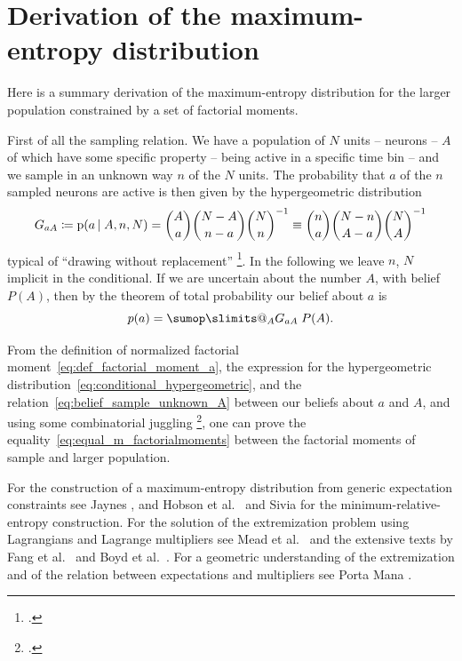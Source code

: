 \documentclass[\ifafour a4paper,12pt,\else a5paper,10pt,\fi%
onecolumn,oneside,article,%
british%
]{memoir}
\makeatletter
\theoremstyle{remark}
\theoremstyle{innote}
\def\sum{\DOTSI\sumop\slimits@}
\newcommand*{\citep}{\footcites}
\newcommand*{\citey}{\parencites*}
\newcommand*{\defd}{\coloneqq}
\newcommand*{\pf}{\mathrm{p}}%
\renewcommand*{\|}{\nonscript\,\vert\nonscript\;\mathopen{}}
\newcommand*{\sect}{\S}%
\newcommand*{\sects}{\S\S}%
\newcommand*{\chap}{ch.}%
\newcommand*{\chaps}{chs}%
\newcommand*{\eg}{{e.g.}}
\newcommand*{\etal}{{et al.}}
\newcommand*{\yG}{G}
\newcommand*{\yAv}{A}
\newcommand*{\yav}{a}
\newcommand*{\ya}{\yav}%
\newcommand*{\yA}{\yAv}%
\makeatother
\begin{document}
\section{Derivation of the maximum-entropy distribution}
\label{sec:derivation_maxent_fullnet}

Here is a summary derivation of the maximum-entropy distribution for the
larger population constrained by a set of factorial moments.%

\bigskip

First of all the sampling relation. We have a population of $N$ units --
neurons -- $\yA$ of which have some specific property -- being active in a
specific time bin -- and we sample in an unknown way $n$ of the $N$ units.
The probability that $\ya$ of the $n$ sampled neurons are active is then
given by the hypergeometric distribution
\begin{equation}
  \label{eq:conditional_hypergeometric}
  \yG_{\ya\yA} \defd \pf(\ya \|\yA, n,N)=
  \binom{\yA}{\ya}\binom{N-\yA}{n-\ya}\binom{N}{n}^{-1}
\equiv  \binom{n}{\ya}\binom{N-n}{\yA-\ya}\binom{N}{\yA}^{-1}
\end{equation}
typical of \enquote{drawing without replacement}
\citep[\eg][\chap~3]{jaynes1994_r2003}. %
In the following we leave $n$, $N$ implicit in the conditional. If we are
uncertain about the number $\yA$, with belief $P(\yA)$, then by the theorem
of total probability our belief about $\ya$ is
\begin{equation}
  \label{eq:belief_sample_unknown_A}
  p(\ya)= \sum_{\yA} \yG_{\ya\yA} \;P(\yA).
\end{equation}

From the definition of normalized factorial
moment~\eqref{eq:def_factorial_moment_a}, the expression for the
hypergeometric distribution~\eqref{eq:conditional_hypergeometric}, and the
relation~\eqref{eq:belief_sample_unknown_A} between our beliefs about $\ya$
and $\yA$, and using some combinatorial juggling
\citep%
[appendix~A and references therein]{portamanaetal2015}, one can prove the
equality~\eqref{eq:equal_m_factorialmoments} between the factorial moments
of sample and larger population.

\bigskip

For the construction of a maximum-entropy distribution from generic
expectation constraints see Jaynes
\citey{jaynes1963}[\chap~11]{jaynes1994_r2003}, and Hobson \etal\
\citey{hobsonetal1973} and Sivia \citey[\sect~5.2.2]{sivia1996_r2006} for
the minimum-relative-entropy construction. For the solution of the
extremization problem using Lagrangians and Lagrange multipliers see Mead
\etal\ \citey{meadetal1984} and the extensive texts by Fang \etal\
\citey{fangetal1997} and Boyd \etal\ \citey{boydetal2004_r2009}. For a
geometric understanding of the extremization and of the relation between
expectations and multipliers see Porta Mana \citey{portamana2017b}.
\end{document}
